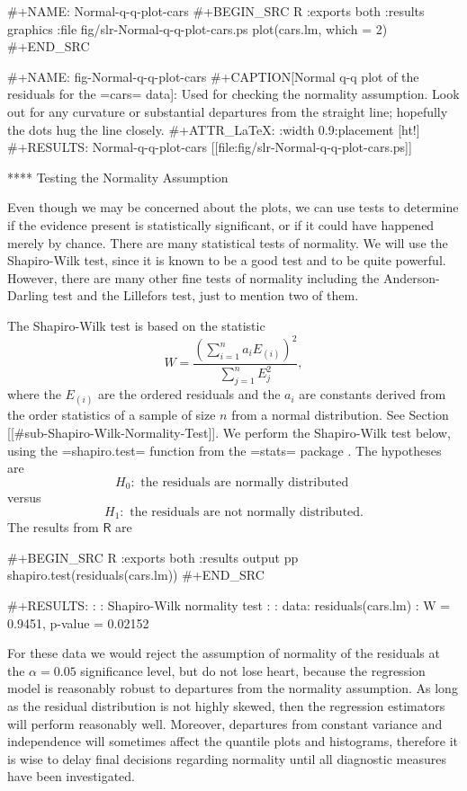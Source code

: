 #+NAME: Normal-q-q-plot-cars
#+BEGIN_SRC R :exports both :results graphics :file fig/slr-Normal-q-q-plot-cars.ps
plot(cars.lm, which = 2)
#+END_SRC

#+NAME: fig-Normal-q-q-plot-cars
#+CAPTION[Normal q-q plot of the residuals for the =cars= data]: \small Used for checking the normality assumption. Look out for any curvature or substantial departures from the straight line; hopefully the dots hug the line closely.
#+ATTR_LaTeX: :width 0.9\textwidth :placement [ht!]
#+RESULTS: Normal-q-q-plot-cars
[[file:fig/slr-Normal-q-q-plot-cars.ps]]

**** Testing the Normality Assumption

Even though we may be concerned about the plots, we can use tests to
determine if the evidence present is statistically significant, or if
it could have happened merely by chance. There are many statistical
tests of normality. We will use the Shapiro-Wilk test, since it is
known to be a good test and to be quite powerful. However, there are
many other fine tests of normality including the Anderson-Darling test
and the Lillefors test, just to mention two of them.

The Shapiro-Wilk test is based on the statistic
\begin{equation}
W=\frac{\left(\sum_{i=1}^{n}a_{i}E_{(i)}\right)^{2}}{\sum_{j=1}^{n}E_{j}^{2}},
\end{equation}
where the \(E_{(i)}\) are the ordered residuals and the \(a_{i}\) are
constants derived from the order statistics of a sample of size \(n\)
from a normal distribution. See Section [[#sub-Shapiro-Wilk-Normality-Test]].
We perform the Shapiro-Wilk test below, using the =shapiro.test=
function from the =stats= package \cite{stats}. The hypotheses are \[
H_{0}:\mbox{ the residuals are normally distributed } \] versus \[
H_{1}:\mbox{ the residuals are not normally distributed.}  \] The
results from \(\mathsf{R}\) are

#+BEGIN_SRC R :exports both :results output pp 
shapiro.test(residuals(cars.lm))
#+END_SRC

#+RESULTS:
: 
: 	Shapiro-Wilk normality test
: 
: data:  residuals(cars.lm)
: W = 0.9451, p-value = 0.02152

For these data we would reject the assumption of normality of the
residuals at the \(\alpha=0.05\) significance level, but do not lose
heart, because the regression model is reasonably robust to departures
from the normality assumption. As long as the residual distribution is
not highly skewed, then the regression estimators will perform
reasonably well. Moreover, departures from constant variance and
independence will sometimes affect the quantile plots and histograms,
therefore it is wise to delay final decisions regarding normality
until all diagnostic measures have been investigated.

